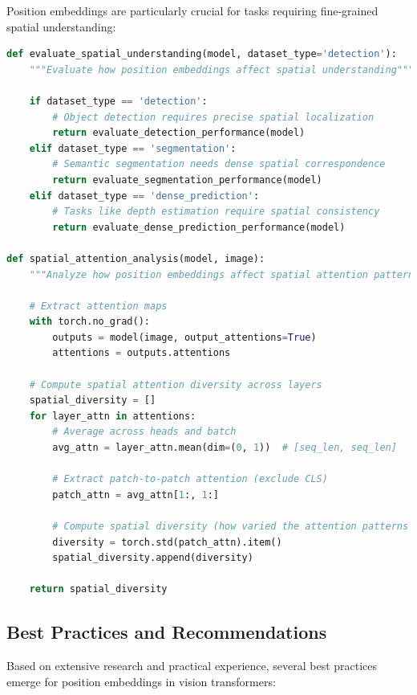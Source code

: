 Position embeddings are particularly crucial for tasks requiring fine-grained spatial understanding:

\begin{lstlisting}[language=Python, caption=Evaluating spatial understanding with different position embeddings]
def evaluate_spatial_understanding(model, dataset_type='detection'):
    """Evaluate how position embeddings affect spatial understanding"""
    
    if dataset_type == 'detection':
        # Object detection requires precise spatial localization
        return evaluate_detection_performance(model)
    elif dataset_type == 'segmentation':
        # Semantic segmentation needs dense spatial correspondence
        return evaluate_segmentation_performance(model)
    elif dataset_type == 'dense_prediction':
        # Tasks like depth estimation require spatial consistency
        return evaluate_dense_prediction_performance(model)

def spatial_attention_analysis(model, image):
    """Analyze how position embeddings affect spatial attention patterns"""
    
    # Extract attention maps
    with torch.no_grad():
        outputs = model(image, output_attentions=True)
        attentions = outputs.attentions
    
    # Compute spatial attention diversity across layers
    spatial_diversity = []
    for layer_attn in attentions:
        # Average across heads and batch
        avg_attn = layer_attn.mean(dim=(0, 1))  # [seq_len, seq_len]
        
        # Extract patch-to-patch attention (exclude CLS)
        patch_attn = avg_attn[1:, 1:]
        
        # Compute spatial diversity (how varied the attention patterns are)
        diversity = torch.std(patch_attn).item()
        spatial_diversity.append(diversity)
    
    return spatial_diversity
\end{lstlisting}

\subsection{Best Practices and Recommendations}

Based on extensive research and practical experience, several best practices emerge for position embeddings in vision transformers:

